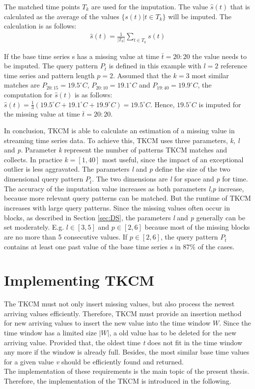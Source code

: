 \documentclass[abstracton,12pt]{scrreprt}
\begin{document}
The matched time points $T_k$ are used for the imputation. The value $\hat{s}(t)$ that is calculated as the average of the values $\{s(t) | t \in T_k\}$ will be imputed. The calculation is as follows: 
\begin{align*}
\hat{s}(t) = \frac{1}{|T_k|} \displaystyle\sum_{t \in T_k}^{} s(t)
\end{align*}
\begin{exmp}
	If the base time series s has a missing value at time $\bar{t}=20:20$ the value needs to be imputed. The query pattern $P_{\bar{t}}$ is defined in this example with $l=2$ reference time series and pattern length $p=2$. Assumed that the $k=3$ most similar matches are $P_{20:15} = 19.5^{\circ}C$, $P_{20:10}= 19.1^{\circ}C$ and $P_{19:40} = 19.9^{\circ}C$, the computation for $\hat{s}(t)$ is as follows: $\hat{s}(t) = \frac{1}{3}(19.5^{\circ}C + 19.1^{\circ}C + 19.9^{\circ}C) = 19.5^{\circ}C$. Hence, $19.5^{\circ}C$ is imputed for the missing value at time $\bar{t}=20:20$.
\end{exmp}
In conclusion, TKCM is able to calculate an estimation of a missing value in streaming time series data. To achieve this, TKCM uses three parameters, \emph{k, l} and \emph{p}. Parameter \emph{k} represent the number of patterns TKCM matches and collects. In practice $k =[1,40]$ most useful, since the impact of an exceptional outlier is less aggravated. The parameters \emph{l} and \emph{p} define the size of the two dimensional query pattern $P_{\bar{t}}$. The two dimensions are \emph{l} for space and \emph{p} for time. The accuracy of the imputation value increases as both parameters \emph{l,p} increase, because more relevant query patterns can be matched. But the runtime of TKCM increases with large query patterns. Since the missing values often occur in blocks, as described in Section \ref{sec:DS}, the parameters \emph{l} and \emph{p} generally can be set moderately. E.g. 
$l \in [3,5]$ and $p \in [2,6]$ because most of the missing blocks are no more than 5 consecutive values. If 
$p \in [2,6]$, the query pattern $P_{\bar{t}}$ contains at least one past value of the base time series \emph{s} in 87\% of the cases.


\section{Implementing TKCM}
\label{sec:ImpTKCM}
The TKCM must not only insert missing values, but also process the newest arriving values efficiently. Therefore, TKCM must provide an insertion method for new arriving values to insert the new value into the time window $W$. Since the time window has a limited size $|W|$, a old value has to be deleted for the new arriving value. Provided that, the oldest time \emph{t} does not fit in the time window any more if the window is already full. Besides, the most similar base time values for a given value \emph{v} should be efficiently found and returned. \\
The implementation of these requirements is the main topic of the present thesis. Therefore, the implementation of the TKCM is introduced in the following.
\end{document}
